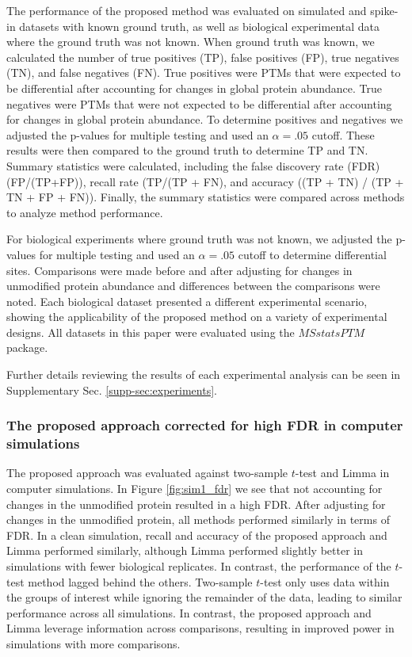 \documentclass[mcp]{article}
\numberwithin{table}{section}
\begin{document}
The performance of the proposed method was evaluated on simulated and spike-in datasets with known ground truth, as well as biological experimental data where the ground truth was not known. When ground truth was known, we calculated the number of true positives (TP), false positives (FP), true negatives (TN), and false negatives (FN). True positives were PTMs that were expected to be differential after accounting for changes in global protein abundance. True negatives were PTMs that were not expected to be differential after accounting for changes in global protein abundance. To determine positives and negatives we adjusted the p-values for multiple testing and used an $\alpha=.05$ cutoff. These results were then compared to the ground truth to determine TP and TN. Summary statistics were calculated, including the false discovery rate (FDR) (FP/(TP+FP)), recall rate (TP/(TP + FN), and accuracy ((TP + TN) / (TP + TN + FP + FN)). Finally, the summary statistics were compared across methods to analyze method performance. 

For biological experiments where ground truth was not known, we adjusted the p-values for multiple testing and used an $\alpha=.05$ cutoff to determine differential sites. Comparisons were made before and after adjusting for changes in unmodified protein abundance and differences between the comparisons were noted. Each biological dataset presented a different experimental scenario, showing the applicability of the proposed method on a variety of experimental designs. All datasets in this paper were evaluated using the $MSstatsPTM$ package.

Further details reviewing the results of each experimental analysis can be seen in Supplementary Sec. \ref{supp-sec:experiments}. 

\subsubsection*{The proposed approach corrected for high FDR in computer simulations}

The proposed approach was evaluated against two-sample $t$-test and Limma in computer simulations. 
In Figure \ref{fig:sim1_fdr} we see that not accounting for changes in the unmodified protein resulted in a high FDR. After adjusting for changes in the unmodified protein, all methods performed similarly in terms of FDR. In a clean simulation, recall and accuracy of the proposed approach and Limma performed similarly, although Limma performed slightly better in simulations with fewer biological replicates. In contrast, the performance of the $t$-test method lagged behind the others. Two-sample $t$-test only uses data within the groups of interest while ignoring the remainder of the data, leading to similar performance across all simulations. In contrast, the proposed approach and Limma leverage information across comparisons, resulting in improved power in simulations with more comparisons.
\end{document}

